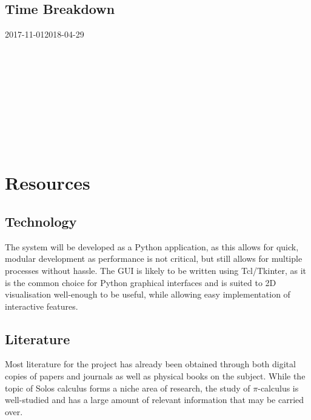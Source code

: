 \documentclass{article}
\begin{document}
\subsection{Time Breakdown}
\begin{center}
	\begin{ganttchart}[
		hgrid,
		vgrid={*{6}{draw=none}, dotted},
		time slot format=isodate,
		y unit title=0.6cm,
		y unit chart=0.6cm,
		x unit=0.065cm,
		milestone/.append style={xscale=5},
	]{2017-11-01}{2018-04-29}
		 \\
		 \\
		 \\
		 \\
		 \\
		 \\
		 \\
		 \\
		 \\
		 \\
	\end{ganttchart}
\end{center}

\section{Resources}
\subsection{Technology}
The system will be developed as a Python application, as this allows for quick, modular development as performance is not critical, but still allows for multiple processes without hassle.
The GUI is likely to be written using Tcl/Tkinter, as it is the common choice for Python graphical interfaces and is suited to 2D visualisation well-enough to be useful, while allowing easy implementation of interactive features.

\subsection{Literature}
Most literature for the project has already been obtained through both digital copies of papers and journals as well as physical books on the subject. While the topic of Solos calculus forms a niche area of research, the study of $\pi$-calculus is well-studied and has a large amount of relevant information that may be carried over.
\end{document}
